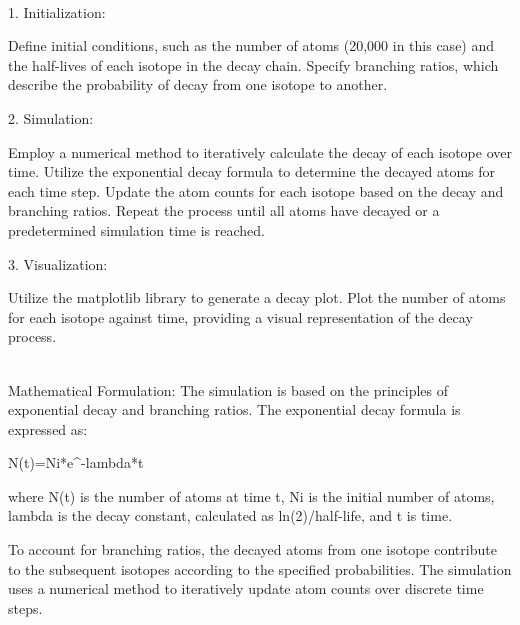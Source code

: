 \documentclass[12pt]{article}
\begin{document}
\vskip0.1in
 \\

1. Initialization:

Define initial conditions, such as the number of atoms (20,000 in this case) and the half-lives of each isotope in the decay chain.
Specify branching ratios, which describe the probability of decay from one isotope to another.

2. Simulation:

Employ a numerical method to iteratively calculate the decay of each isotope over time.
Utilize the exponential decay formula to determine the decayed atoms for each time step.
Update the atom counts for each isotope based on the decay and branching ratios.
Repeat the process until all atoms have decayed or a predetermined simulation time is reached.

3. Visualization:

Utilize the matplotlib library to generate a decay plot.
Plot the number of atoms for each isotope against time, providing a visual representation of the decay process.


\clearpage %





 \\

Mathematical Formulation:
The simulation is based on the principles of exponential decay and branching ratios. The exponential decay formula is expressed as:

N(t)=Ni*e^-lambda*t

where N(t) is the number of atoms at time t,
Ni is the initial number of atoms,
lambda is the decay constant, calculated as ln(2)/half-life,
and t is time.

To account for branching ratios, the decayed atoms from one isotope contribute to the subsequent isotopes according to the specified probabilities. The simulation uses a numerical method to iteratively update atom counts over discrete time steps.
\end{document}
